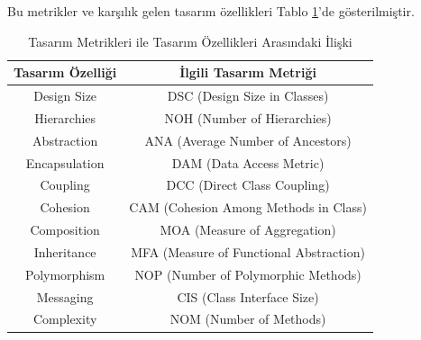 \documentclass[conference]{IEEEtran}
\begin{document}
Bu metrikler ve karşılık gelen tasarım özellikleri Tablo \ref{table:1}'de gösterilmiştir.
\begin{table}[h]
	\centering
	\begin{tabular}{|c|c|}
		\hline
		\textbf{Tasarım Özelliği} & \textbf{İlgili Tasarım Metriği} \\
		\hline
		Design Size & DSC (Design Size in Classes) \\
		\hline
		Hierarchies & NOH (Number of Hierarchies) \\
		\hline
		Abstraction & ANA (Average Number of Ancestors) \\
		\hline
		Encapsulation & DAM (Data Access Metric) \\
		\hline
		Coupling & DCC (Direct Class Coupling) \\
		\hline
		Cohesion & CAM (Cohesion Among Methods in Class) \\
		\hline
		Composition & MOA (Measure of Aggregation) \\
		\hline
		Inheritance & MFA (Measure of Functional Abstraction) \\
		\hline
		Polymorphism & NOP (Number of Polymorphic Methods) \\
		\hline
		Messaging & CIS (Class Interface Size) \\
		\hline
		Complexity & NOM (Number of Methods) \\
		\hline
	\end{tabular}
	\caption{Tasarım Metrikleri ile Tasarım Özellikleri Arasındaki İlişki}
	\label{table:1}
\end{table}
\end{document}
